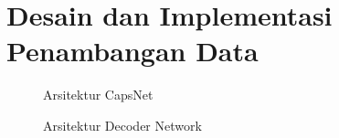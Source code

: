 \documentclass{article}
\begin{document}
	\section{Desain dan Implementasi Penambangan Data}
		\begin{figure}[H]
			\caption{Arsitektur CapsNet}
			\label{arsitektur_1}
		\end{figure}
		\begin{figure}[H]
			\caption{Arsitektur Decoder Network}
			\label{arsitektur_2}
		\end{figure}
\end{document}
